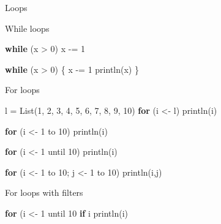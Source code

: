 \documentclass[ignorenonframetext,]{beamer}
\newenvironment{Shaded}{\begin{snugshade}}{\end{snugshade}}
\newcommand{\KeywordTok}[1]{\textcolor[rgb]{0.13,0.29,0.53}{\textbf{#1}}}
\newcommand{\DecValTok}[1]{\textcolor[rgb]{0.00,0.00,0.81}{#1}}
\newcommand{\FunctionTok}[1]{\textcolor[rgb]{0.00,0.00,0.00}{#1}}
\newcommand{\NormalTok}[1]{#1}
\begin{document}
\begin{frame}[fragile]{Loops}

\begin{block}{While loops}

\begin{Shaded}
\begin{Highlighting}[]
\KeywordTok{while}\NormalTok{ (x > }\DecValTok{0}\NormalTok{)}
\NormalTok{    x -= }\DecValTok{1}

\KeywordTok{while}\NormalTok{ (x > }\DecValTok{0}\NormalTok{) \{}
\NormalTok{    x -= }\DecValTok{1}
    \FunctionTok{println}\NormalTok{(x)}
\NormalTok{\}}
\end{Highlighting}
\end{Shaded}

\end{block}

\begin{block}{For loops}

\begin{Shaded}
\begin{Highlighting}[]
\NormalTok{l = List(}\DecValTok{1}\NormalTok{, }\DecValTok{2}\NormalTok{, }\DecValTok{3}\NormalTok{, }\DecValTok{4}\NormalTok{, }\DecValTok{5}\NormalTok{, }\DecValTok{6}\NormalTok{, }\DecValTok{7}\NormalTok{, }\DecValTok{8}\NormalTok{, }\DecValTok{9}\NormalTok{, }\DecValTok{10}\NormalTok{)}
\KeywordTok{for}\NormalTok{ (i <- l)}
    \FunctionTok{println}\NormalTok{(i)}

\KeywordTok{for}\NormalTok{ (i <- }\DecValTok{1}\NormalTok{ to }\DecValTok{10}\NormalTok{)}
    \FunctionTok{println}\NormalTok{(i)}

\KeywordTok{for}\NormalTok{ (i <- }\DecValTok{1}\NormalTok{ until }\DecValTok{10}\NormalTok{)}
    \FunctionTok{println}\NormalTok{(i)}

\KeywordTok{for}\NormalTok{ (i <- }\DecValTok{1}\NormalTok{ to }\DecValTok{10}\NormalTok{; j <- }\DecValTok{1}\NormalTok{ to }\DecValTok{10}\NormalTok{)}
    \FunctionTok{println}\NormalTok{(i,j)}
\end{Highlighting}
\end{Shaded}

\end{block}

\begin{block}{For loops with filters}

\begin{Shaded}
\begin{Highlighting}[]
\KeywordTok{for}\NormalTok{ (i <- }\DecValTok{1}\NormalTok{ until }\DecValTok{10} \KeywordTok{if}\NormalTok{ i %
    \FunctionTok{println}\NormalTok{(i)}

}
\end{Highlighting}
\end{Shaded}
\end{block}
\end{frame}
\end{document}
